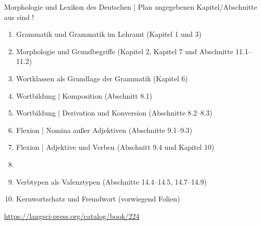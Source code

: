   \begin{frame}
    {Morphologie und Lexikon des Deutschen | Plan}
     angegebenen Kapitel\slash Abschnitte aus  sind !\\
    \Halbzeile
    \begin{enumerate}
      \item Grammatik und Grammatik im Lehramt (Kapitel 1 und 3)
      \item Morphologie und Grundbegriffe (Kapitel 2, Kapitel 7 und Abschnitte 11.1--11.2)
      \item Wortklassen als Grundlage der Grammatik (Kapitel 6)
      \item Wortbildung | Komposition (Abschnitt 8.1)
      \item Wortbildung | Derivation und Konversion (Abschnitte 8.2--8.3)
      \item Flexion | Nomina außer Adjektiven (Abschnitte 9.1--9.3)
      \item Flexion | Adjektive und Verben (Abschnitt 9.4 und Kapitel 10)
      \item {}
      \item Verbtypen als Valenztypen (Abschnitte 14.4--14.5, 14.7--14.9) 
      \item Kernwortschatz und Fremdwort (vorwiegend Folien)
    \end{enumerate}
    \Halbzeile
    \centering 
    \url{https://langsci-press.org/catalog/book/224}
  \end{frame}
\fi

